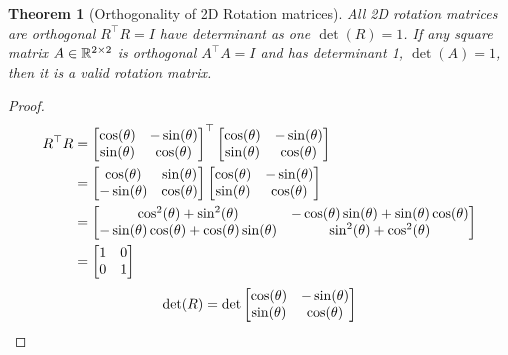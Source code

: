 \documentclass{article}
\newtheorem{thm}{Theorem}
\begin{document}
\begin{thm}[Orthogonality of 2D Rotation matrices]
  All 2D rotation matrices  are orthogonal $R^\top R = I$ have determinant as one
  $\det(R) =  1$. If any square matrix $A \in \mathbb{R}^{2\times  2}$ is orthogonal $A^\top A = I$  and has
  determinant 1, $\det(A) = 1$, then  it is a valid rotation matrix.
\end{thm}
\begin{proof}
  \begin{align}
    R^\top R
    &= \begin{bmatrix}
      \cos(\theta)  &  -\sin(\theta)
      \\
      \sin(\theta) &   \cos(\theta)
    \end{bmatrix}^\top \begin{bmatrix}
      \cos(\theta)  &  -\sin(\theta)
      \\
      \sin(\theta) &   \cos(\theta)
    \end{bmatrix}
    \notag\\
    &=\begin{bmatrix}
      \cos(\theta)  &  \sin(\theta)
      \\
      -\sin(\theta) &   \cos(\theta)
    \end{bmatrix} \begin{bmatrix}
      \cos(\theta)  &  -\sin(\theta)
      \\
      \sin(\theta) &   \cos(\theta)
    \end{bmatrix}
  \notag\\
    &=\begin{bmatrix}
      \cos^2(\theta)+\sin^2(\theta)  &  -\cos(\theta)\sin(\theta)+\sin(\theta)\cos(\theta)
      \\
      -\sin(\theta)\cos(\theta)+\cos(\theta)\sin(\theta) &   \sin^2(\theta)+\cos^2(\theta)
    \end{bmatrix}
\notag\\
    &=\begin{bmatrix}
      1  &  0  \\ 0  &   1\end{bmatrix}
    \end{align}
    \begin{align}
      \det(R) &
                =  \det\begin{bmatrix}
        \cos(\theta)  &  -\sin(\theta)
        \\
        \sin(\theta) &   \cos(\theta)
        \end{bmatrix}
                       \notag\\

\end{align}
\end{proof}
\end{document}

